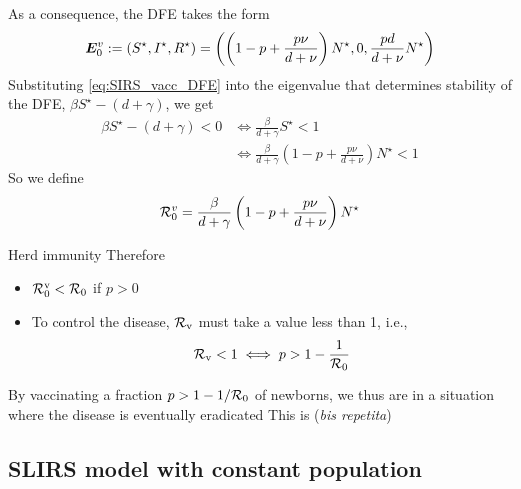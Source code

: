 \documentclass[aspectratio=169]{beamer}\usepackage[]{graphicx}\usepackage[]{xcolor}
\begin{document}
\begin{frame}
As a consequence, the DFE takes the form
\begin{equation}\label{eq:SIRS_vacc_DFE}
\bm{E}_0^v := (S^\star,I^\star,R^\star) =
\left(
\left(1-p+\frac{p\nu}{d+\nu}\right)N^\star,0,
\frac{pd}{d+\nu}N^\star
\right)
\end{equation}
\vfill
Substituting \eqref{eq:SIRS_vacc_DFE} into the eigenvalue that determines stability of the DFE, $\beta S^\star-(d+\gamma)$, we get
\begin{align*}
\beta S^\star-(d+\gamma)<0 &\iff
\frac\beta{d+\gamma} S^\star <1 \\
&\iff 
\frac\beta{d+\gamma}
\left(1-p+\frac{p\nu}{d+\nu}\right)N^\star<1
\end{align*}
So we define
\begin{equation}\label{eq:SIRS_vacc_R0}
\mathcal{R}_0^v =
\frac\beta{d+\gamma}
\left(1-p+\frac{p\nu}{d+\nu}\right)N^\star
\end{equation}
\end{frame}


\begin{frame}{Herd immunity}
  Therefore 
  \begin{itemize}
  \item $\mathcal{R}_0^{\textrm{v}}<\mathcal{R}_0$ if $p>0$
  \item To control the disease, $\mathcal{R}_{\text{v}}$ must take a value less than 1, i.e.,
  \begin{equation}
    \mathcal{R}_{\text{v}}<1 \iff p> 1-\frac{1}{\mathcal{R}_0}
  \end{equation}
  \end{itemize}
  \vfill
  By vaccinating a fraction $p>1-1/\mathcal{R}_0$ of newborns, we thus are in a situation where the disease is eventually eradicated
  \vfill
  This is  (\emph{bis repetita})
\end{frame}

\subsection{SLIRS model with constant population}

\end{document}
